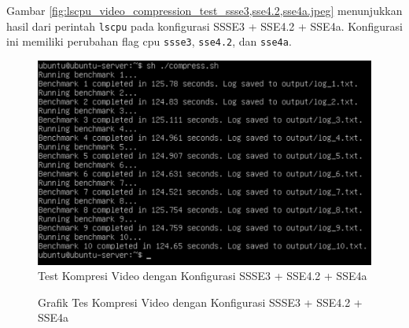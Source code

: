 Gambar \ref{fig:lscpu_video_compression_test_ssse3,sse4.2,sse4a.jpeg} menunjukkan hasil dari perintah \texttt{lscpu} pada konfigurasi SSSE3 + SSE4.2 + SSE4a. Konfigurasi ini memiliki perubahan flag cpu \texttt{ssse3}, \texttt{sse4.2}, dan \texttt{sse4a}.

\begin{figure}
    \centering
    \includegraphics[width=1\textwidth]
    {assets/pics/video-compression-test/ssse3,sse4.2,sse4a.jpeg}
    \caption{Test Kompresi Video dengan Konfigurasi SSSE3 + SSE4.2 + SSE4a}
    \label{fig:video_compression_test_ssse3,sse4.2,sse4a.jpeg}
\end{figure}

\begin{figure}
    \centering
    \caption{Grafik Tes Kompresi Video dengan Konfigurasi SSSE3 + SSE4.2 + SSE4a}
    \label{fig:video_compression_test_ssse3,sse4.2,sse4a_graph}
\end{figure}

